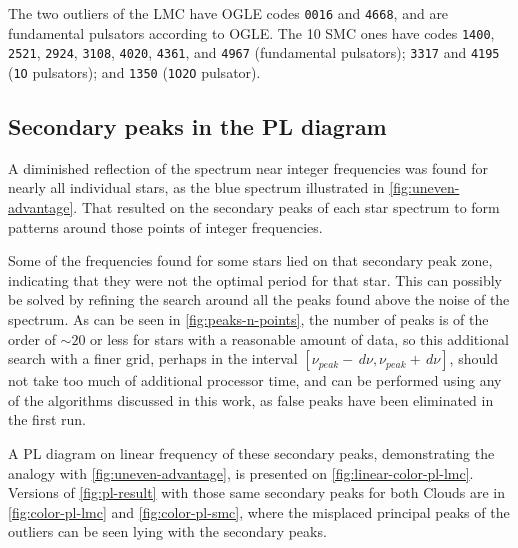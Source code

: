The two outliers of the LMC have OGLE codes \texttt{0016} and \texttt{4668}, and are fundamental pulsators according to OGLE.
The 10 SMC ones have codes 
\texttt{1400}, 
\texttt{2521}, 
\texttt{2924}, 
\texttt{3108}, 
\texttt{4020}, 
\texttt{4361}, and
\texttt{4967} (fundamental pulsators);
\texttt{3317} and
\texttt{4195} (\texttt{1O} pulsators); and 
\texttt{1350} (\texttt{1O2O} pulsator).

\subsection{Secondary peaks in the PL diagram}

A diminished reflection of the spectrum near integer frequencies was found for nearly all individual stars,
as the blue spectrum illustrated in \autoref{fig:uneven-advantage}.
That resulted on the secondary peaks of each star spectrum to form patterns around those points of integer frequencies.

Some of the frequencies found for some stars lied on that secondary peak zone, indicating that they were not the optimal period for that star.
This can possibly be solved by refining the search around all the peaks found above the noise of the spectrum.
As can be seen in \autoref{fig:peaks-n-points}, the number of peaks is of the order of $\sim20$ or less for stars with a reasonable amount of data,
so this additional search with a finer grid, perhaps in the interval $[\nu_{peak}-\,d\nu,\nu_{peak}+\,d\nu]$, should not take too much of additional processor time,
and can be performed using any of the algorithms discussed in this work, as false peaks have been eliminated in the first run.

A PL diagram on linear frequency of these secondary peaks, demonstrating the analogy with \autoref{fig:uneven-advantage}, is presented on \autoref{fig:linear-color-pl-lmc}.
Versions of \autoref{fig:pl-result} with those same secondary peaks for both Clouds are in \autoref{fig:color-pl-lmc} and \autoref{fig:color-pl-smc},
where the misplaced principal peaks of the outliers can be seen lying with the secondary peaks.


